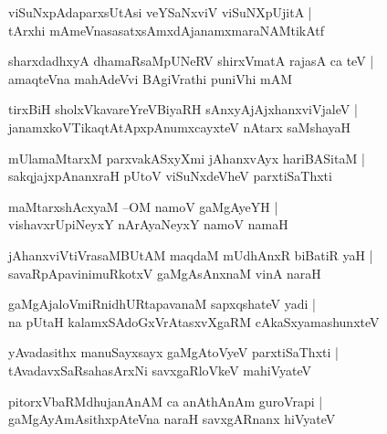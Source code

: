 \documentclass[twoside,12pt,openright]{book}
\newcounter{shloka}[chapter]
\begin{document}
\begin{shloka}%
viSuNxpAdaparxsUtAsi veYSaNxviV viSuNXpUjitA |\\
tArxhi mAmeVnasasatxsAmxdAjanamxmaraNAMtikAtf
\end{shloka}

\begin{shloka}%
sharxdadhxyA dhamaRsaMpUNeRV shirxVmatA rajasA ca teV |\\
amaqteVna mahAdeVvi BAgiVrathi puniVhi mAM 
\end{shloka}

\begin{shloka}%
tirxBiH sholxVkavareYreVBiyaRH sAnxyAjAjxhanxviVjaleV |\\
janamxkoVTikaqtAtApxpAnumxcayxteV nAtarx saMshayaH
\end{shloka}

\begin{shloka}%
mUlamaMtarxM parxvakASxyXmi jAhanxvAyx hariBASitaM |\\
sakqjajxpAnanxraH pUtoV viSuNxdeVheV parxtiSaThxti 
\end{shloka}

\begin{shloka}%
maMtarxshAcxyaM --OM namoV gaMgAyeYH |\\
vishavxrUpiNeyxY nArAyaNeyxY namoV namaH 
\end{shloka}

\begin{shloka}%
jAhanxviVtiVrasaMBUtAM maqdaM mUdhAnxR biBatiR yaH |\\
savaRpApavinimuRkotxV gaMgAsAnxnaM vinA naraH 
\end{shloka}

\begin{shloka}%
gaMgAjaloVmiRnidhURtapavanaM sapxqshateV yadi |\\
na pUtaH kalamxSAdoGxVrAtasxvXgaRM cAkaSxyamashunxteV 
\end{shloka}

\begin{shloka}%
yAvadasithx manuSayxsayx gaMgAtoVyeV parxtiSaThxti |\\
tAvadavxSaRsahasArxNi savxgaRloVkeV mahiVyateV 
\end{shloka}

\begin{shloka}%
pitorxVbaRMdhujanAnAM ca anAthAnAm guroVrapi |\\
gaMgAyAmAsithxpAteVna naraH savxgARnanx hiVyateV 
\end{shloka}
\end{document}
